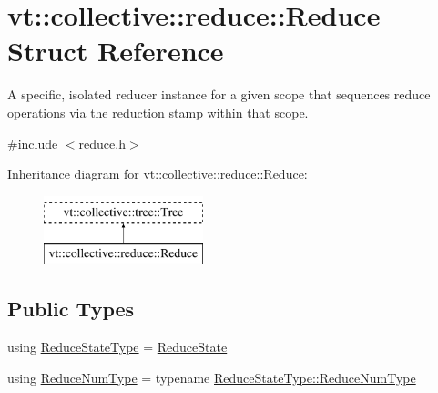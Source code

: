 \hypertarget{structvt_1_1collective_1_1reduce_1_1_reduce}{}\section{vt\+:\+:collective\+:\+:reduce\+:\+:Reduce Struct Reference}
\label{structvt_1_1collective_1_1reduce_1_1_reduce}


A specific, isolated reducer instance for a given scope that sequences reduce operations via the reduction stamp within that scope.  




{\ttfamily \#include $<$reduce.\+h$>$}

Inheritance diagram for vt\+:\+:collective\+:\+:reduce\+:\+:Reduce\+:\begin{figure}[H]
\begin{center}
\leavevmode
\includegraphics[height=2.000000cm]{structvt_1_1collective_1_1reduce_1_1_reduce}
\end{center}
\end{figure}
\subsection*{Public Types}
\begin{DoxyCompactItemize}
\item 
using \hyperlink{structvt_1_1collective_1_1reduce_1_1_reduce_ab0e89b962f0741718107772505fe6d34}{Reduce\+State\+Type} = \hyperlink{structvt_1_1collective_1_1reduce_1_1_reduce_state}{Reduce\+State}
\item 
using \hyperlink{structvt_1_1collective_1_1reduce_1_1_reduce_a6c3e63aca10c31d2823b0b18cf9762a4}{Reduce\+Num\+Type} = typename \hyperlink{structvt_1_1collective_1_1reduce_1_1_reduce_state_ae83d217c90b8a8895ca998d7ea9c49e4}{Reduce\+State\+Type\+::\+Reduce\+Num\+Type}
\end{DoxyCompactItemize}
